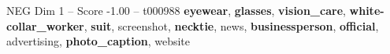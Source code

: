 \begin{textsample}{NEG Dim 1 – Score -1.00 – t000988}  \label{ex:f1_neg_035}
\textbf{eyewear}, \textbf{glasses}, \textbf{vision\_care}, \textbf{white-collar\_worker}, \textbf{suit}, screenshot, \textbf{necktie}, news, \textbf{businessperson}, \textbf{official}, advertising, \textbf{photo\_caption}, website

\end{textsample}
